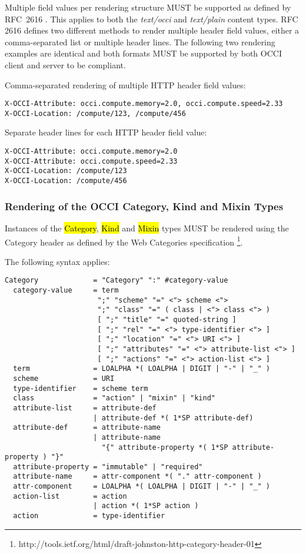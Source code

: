 \documentclass[10pt,a4paper]{article}
\begin{document}
Multiple field values per rendering structure MUST be supported as
defined by RFC~2616 \cite{rfc2616}. This applies to both the
\textit{text/occi} and \textit{text/plain} content types. RFC 2616
defines two different methods to render multiple header field values,
either a comma-separated list or multiple header lines. The following
two rendering examples are identical and both formats MUST be
supported by both OCCI client and server to be compliant.

Comma-separated rendering of multiple HTTP header field values:

\begin{verbatim}
X-OCCI-Attribute: occi.compute.memory=2.0, occi.compute.speed=2.33
X-OCCI-Location: /compute/123, /compute/456
\end{verbatim}

Separate header lines for each HTTP header field value:
\begin{verbatim}
X-OCCI-Attribute: occi.compute.memory=2.0
X-OCCI-Attribute: occi.compute.speed=2.33
X-OCCI-Location: /compute/123
X-OCCI-Location: /compute/456
\end{verbatim}

\subsubsection{Rendering of the OCCI Category, Kind and Mixin Types}
\label{sec:render_cats}
Instances of the \hl{Category}, \hl{Kind} and \hl{Mixin} types
\cite{occi:core} MUST be rendered using the Category header as defined
by the Web Categories specification%
\footnote{http://tools.ietf.org/html/draft-johnston-http-category-header-01}.

The following syntax applies:

\begin{verbatim}
Category             = "Category" ":" #category-value
  category-value     = term
                      ";" "scheme" "=" <"> scheme <">
                      ";" "class" "=" ( class | <"> class <"> )
                      [ ";" "title" "=" quoted-string ]
                      [ ";" "rel" "=" <"> type-identifier <"> ]
                      [ ";" "location" "=" <"> URI <"> ]
                      [ ";" "attributes" "=" <"> attribute-list <"> ]
                      [ ";" "actions" "=" <"> action-list <"> ]
  term               = LOALPHA *( LOALPHA | DIGIT | "-" | "_" )
  scheme             = URI
  type-identifier    = scheme term
  class              = "action" | "mixin" | "kind"
  attribute-list     = attribute-def
                     | attribute-def *( 1*SP attribute-def)
  attribute-def      = attribute-name
                     | attribute-name
                       "{" attribute-property *( 1*SP attribute-property ) "}"
  attribute-property = "immutable" | "required"
  attribute-name     = attr-component *( "." attr-component )
  attr-component     = LOALPHA *( LOALPHA | DIGIT | "-" | "_" )
  action-list        = action
                     | action *( 1*SP action )
  action             = type-identifier
\end{verbatim}
\end{document}
